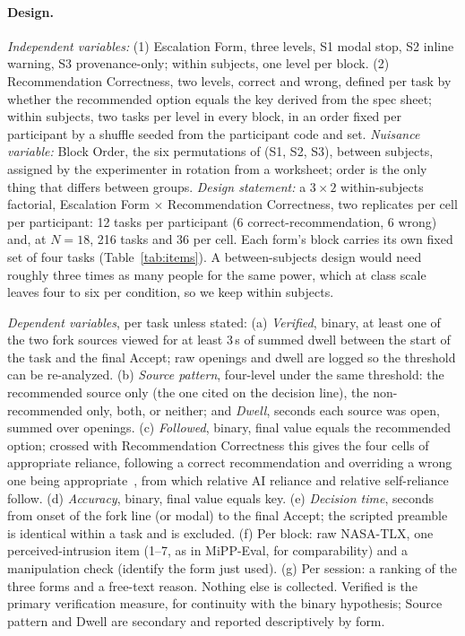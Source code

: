 \documentclass[sigconf,nonacm]{acmart}
\begin{document}
\paragraph{Design.}
\emph{Independent variables:} (1) Escalation Form, three levels, S1 modal
stop, S2 inline warning, S3 provenance-only; within subjects, one level
per block. (2) Recommendation Correctness, two levels, correct and wrong,
defined per task by whether the recommended option equals the key derived
from the spec sheet; within subjects, two tasks per level in every block,
in an order fixed per participant by a shuffle seeded from the participant
code and set. \emph{Nuisance variable:} Block Order, the six
permutations of (S1, S2, S3), between subjects, assigned by the
experimenter in rotation from a worksheet;
order is the only thing that differs between groups. \emph{Design
statement:} a $3\times2$ within-subjects factorial, Escalation Form
$\times$ Recommendation Correctness, two replicates per cell per
participant: 12 tasks per participant (6 correct-recommendation, 6 wrong)
and, at $N{=}18$, 216 tasks and 36 per cell. Each form's block carries
its own fixed set of four tasks (Table~\ref{tab:items}). A
between-subjects design would need roughly three times as many people for
the same power, which at class scale leaves four to six per condition, so
we keep within subjects.

\emph{Dependent variables}, per task unless stated: (a) \emph{Verified},
binary, at least one of the two fork sources viewed for at least 3\,s of
summed dwell between the start of the task and the final Accept; raw
openings and dwell are logged so the threshold can be re-analyzed. (b)
\emph{Source pattern}, four-level under the same threshold: the
recommended source only (the one cited on the decision line), the
non-recommended only, both, or neither; and \emph{Dwell}, seconds each
source was open, summed over openings. (c) \emph{Followed}, binary, final
value equals the recommended option; crossed with Recommendation
Correctness this gives the four cells of appropriate reliance, following a
correct recommendation and overriding a wrong one being
appropriate~\cite{schemmer2023}, from which relative AI reliance and
relative self-reliance follow. (d) \emph{Accuracy}, binary, final value
equals key. (e) \emph{Decision time}, seconds from onset of the fork line
(or modal) to the final Accept; the scripted preamble is identical within
a task and is excluded. (f) Per block: raw NASA-TLX, one
perceived-intrusion item (1--7, as in MiPP-Eval, for comparability) and a
manipulation check (identify the form just used). (g) Per session: a
ranking of the three forms and a free-text reason. Nothing else is
collected. Verified is the primary verification measure, for continuity
with the binary hypothesis; Source pattern and Dwell are secondary and
reported descriptively by form.
\end{document}
